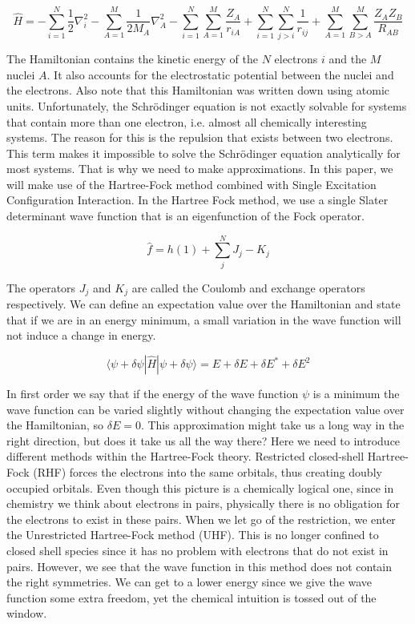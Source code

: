 \documentclass[twoside,twocolumn,9pt]{article}
\begin{document}
\begin{equation}\label{eq:ham}
  \hat{H} = -\sum_{i=1}^N\frac{1}{2}\nabla^2_i - \sum_{A=1}^M \frac{1}{2M_A}\nabla^2_A - \sum_{i=1}^N\sum_{A=1}^M\frac{Z_A}{r_{iA}} + \sum_{i=1}^N\sum_{j>i}^N\frac{1}{r_{ij}} +
  \sum_{A=1}^M\sum_{B>A}^M\frac{Z_A Z_B}{R_{AB}}
\end{equation}

The Hamiltonian contains the kinetic energy of the $N$ electrons $i$ and the $M$ nuclei $A$. It also accounts for the electrostatic potential between the nuclei and the electrons.
Also note that this Hamiltonian was written down using atomic units. Unfortunately, the Schrödinger equation is not exactly solvable for systems that contain more than one electron, i.e.
almost all chemically interesting systems. The reason for this is the repulsion that exists between two electrons. This term makes it impossible to solve the Schrödinger equation
analytically for most systems. That is why we need to make approximations. In this paper, we will make use of the Hartree-Fock method
combined with Single Excitation Configuration Interaction. In the Hartree Fock method, we use a single Slater determinant wave function that is an eigenfunction of the Fock
operator\cite{Szabo1996}. 

\begin{equation}
  \hat{f} = h(1) +  \sum_j^N J_j - K_j
\end{equation}

The operators $J_j$ and $K_j$ are called the Coulomb and exchange operators respectively.
We can define an expectation value over the Hamiltonian and state that if we are in an energy minimum, a small variation in the wave function will not induce a change
in energy.

\begin{equation}\label{eq:hamexp}
  \langle\psi + \delta\psi|\hat{H}|\psi + \delta\psi \rangle = E + \delta E + \delta E^* + \delta E^2
\end{equation}

In first order we say that if the energy of the wave function $\psi$ is a minimum the wave function can be varied slightly without changing the expectation value over the
Hamiltonian, so $\delta E = 0$. 
This approximation might take us a long way in the right direction, but does it take us all the way there? Here we need to introduce different methods within the
Hartree-Fock theory. Restricted closed-shell Hartree-Fock (RHF) forces the electrons into the same orbitals, thus creating doubly occupied orbitals. Even though this
picture is a chemically logical one, since in chemistry we think about electrons in pairs, physically there is no obligation for the electrons to exist in these pairs.
When we let go of the restriction, we enter the Unrestricted Hartree-Fock method (UHF). This  is no longer confined to closed shell species since it has no problem with
electrons that do not exist in pairs. However, we see that the wave function in this method does not contain the right symmetries. We can get to a lower energy since we give
the wave function some extra freedom, yet the chemical intuition is tossed out of the window.
\end{document}

